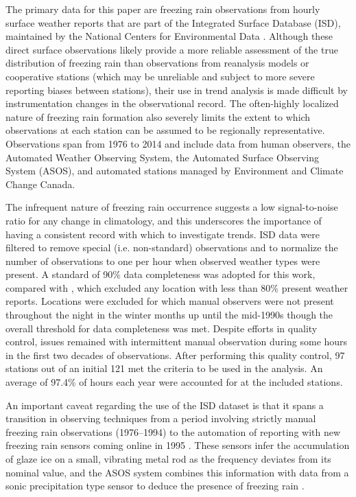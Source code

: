 \documentclass[twocol]{ametsoc}
\begin{document}
The primary data for this paper are freezing rain observations from hourly surface weather reports that are part of the Integrated Surface Database (ISD), maintained by the National Centers for Environmental Data \citep{smith2011integrated}. Although these direct surface observations likely provide a more reliable assessment of the true distribution of freezing rain than observations from reanalysis models or cooperative stations (which may be unreliable and subject to more severe reporting biases between stations), their use in trend analysis is made difficult by instrumentation changes in the observational record. The often-highly localized nature of freezing rain formation also severely limits the extent to which observations at each station can be assumed to be regionally representative. Observations span from 1976 to 2014 and include data from human observers, the Automated Weather Observing System, the Automated Surface Observing System (ASOS), and automated stations managed by Environment and Climate Change Canada.

The infrequent nature of freezing rain occurrence suggests a low signal-to-noise ratio for any change in climatology, and this underscores the importance of having a consistent record with which to investigate trends. ISD data were filtered to remove special (i.e. non-standard) observations and to normalize the number of observations to one per hour when observed weather types were present. A standard of 90\% data completeness was adopted for this work, compared with \citet{cortinas2000climatology}, which excluded any location with less than 80\% present weather reports. Locations were excluded for which manual observers were not present throughout the night in the winter months up until the mid-1990s though the overall threshold for data completeness was met. Despite efforts in quality control, issues remained with intermittent manual observation during some hours in the first two decades of observations. After performing this quality control, 97 stations out of an initial 121 met the criteria to be used in the analysis. An average of 97.4\% of hours each year were accounted for at the included stations.

An important caveat regarding the use of the ISD dataset is that it spans a transition in observing techniques from a period involving strictly manual freezing rain observations (1976--1994) to the automation of reporting with new freezing rain sensors coming online in 1995 \citep{ramsay1995status}. These sensors infer the accumulation of glaze ice on a small, vibrating metal rod as the frequency deviates from its nominal value, and the ASOS system combines this information with data from a sonic precipitation type sensor to deduce the presence of freezing rain \citep{asos1998}.
\end{document}
